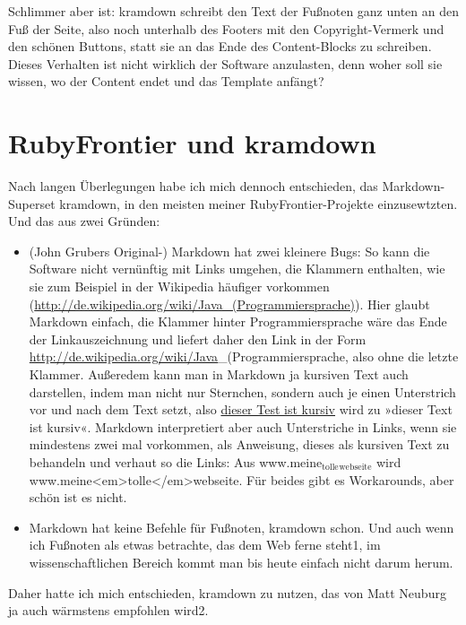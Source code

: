 \documentclass[11pt]{report}
\begin{document}
Schlimmer aber ist: kramdown schreibt den Text der Fußnoten ganz unten
an den Fuß der Seite, also noch unterhalb des Footers mit den
Copyright-Vermerk und den schönen Buttons, statt sie an das Ende des
Content-Blocks zu schreiben. Dieses Verhalten ist nicht wirklich der
Software anzulasten, denn woher soll sie wissen, wo der Content endet
und das Template anfängt?
\section{RubyFrontier und kramdown}
\label{sec-2-7-2}


Nach langen Überlegungen habe ich mich dennoch entschieden, das
Markdown-Superset kramdown, in den meisten meiner
RubyFrontier-Projekte einzusewtzten. Und das aus zwei Gründen:

\begin{itemize}
\item (John Grubers Original-) Markdown hat zwei kleinere Bugs: So kann
  die Software nicht vernünftig mit Links umgehen, die Klammern
  enthalten, wie sie zum Beispiel in der Wikipedia häufiger vorkommen
  (\href{http://de.wikipedia.org/wiki/Java_(Programmiersprache)}{http://de.wikipedia.org/wiki/Java\_(Programmiersprache)}). Hier
  glaubt Markdown einfach, die Klammer hinter Programmiersprache wäre
  das Ende der Linkauszeichnung und liefert daher den Link in der Form
  \href{http://de.wikipedia.org/wiki/Java}{http://de.wikipedia.org/wiki/Java}_(Programmiersprache, also ohne die
  letzte Klammer. Außeredem kann man in Markdown ja kursiven Text auch
  darstellen, indem man nicht nur Sternchen, sondern auch je einen
  Unterstrich vor und nach dem Text setzt, also \underline{dieser Test ist   kursiv} wird zu »dieser Text ist kursiv«. Markdown interpretiert
  aber auch Unterstriche in Links, wenn sie mindestens zwei mal
  vorkommen, als Anweisung, dieses als kursiven Text zu behandeln und
  verhaut so die Links: Aus www.meine$_{\mathrm{tolle}}$$_{\mathrm{webseite}}$ wird
  www.meine<em>tolle</em>webseite. Für beides gibt es Workarounds,
  aber schön ist es nicht.
\item Markdown hat keine Befehle für Fußnoten, kramdown schon. Und auch
  wenn ich Fußnoten als etwas betrachte, das dem Web ferne steht1, im
  wissenschaftlichen Bereich kommt man bis heute einfach nicht darum
  herum.
\end{itemize}

Daher hatte ich mich entschieden, kramdown zu nutzen, das von Matt
Neuburg ja auch wärmstens empfohlen wird2.
\end{document}
